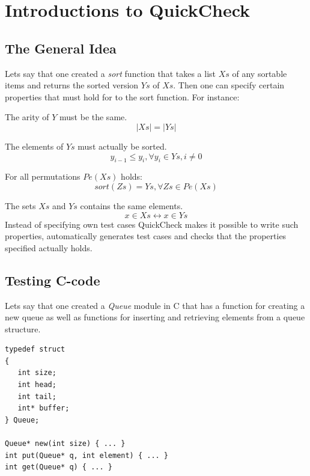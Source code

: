\chapter{Introductions to QuickCheck}
\label{APP:QUICKCHECK}
\lstset{style=erlang}
\label{SEC:QuickCheckIntro}

\section{The General Idea}
Lets say that one created a \emph{sort} function that takes a list $Xs$ of any
sortable items and returns the sorted version $Ys$ of $Xs$. Then one can specify
certain properties that must hold for to the sort function. For instance:

\noindent The arity of $Y$ must be the same.
\begin{equation}
        |Xs| = |Ys|
\end{equation}

\noindent The elements of $Ys$ must actually be sorted.
\begin{equation}
    y_{i-1} \leq y_i, \forall y_i \in Ys, i \neq 0
\end{equation}

\noindent For all permutations $Pe(Xs)$ holds:
\begin{equation}
sort(Zs) = Ys, \forall Zs \in Pe(Xs)
\end{equation}

\noindent The sets $Xs$ and $Ys$ contains the same elements.
\begin{equation}
        x \in Xs \leftrightarrow x \in Ys
\end{equation}
Instead of specifying own test cases QuickCheck makes it possible to write such
properties, automatically generates test cases and checks that the properties
specified actually holds.

\section{Testing C-code}
Lets say that one created a \emph{Queue} module in C that has a
function for creating a new queue as well as functions for inserting and retrieving elements from a queue structure.

\begin{lstlisting}[style=c]
typedef struct
{
   int size;
   int head;
   int tail;
   int* buffer;
} Queue;

Queue* new(int size) { ... }
int put(Queue* q, int element) { ... }
int get(Queue* q) { ... }
\end{lstlisting}

